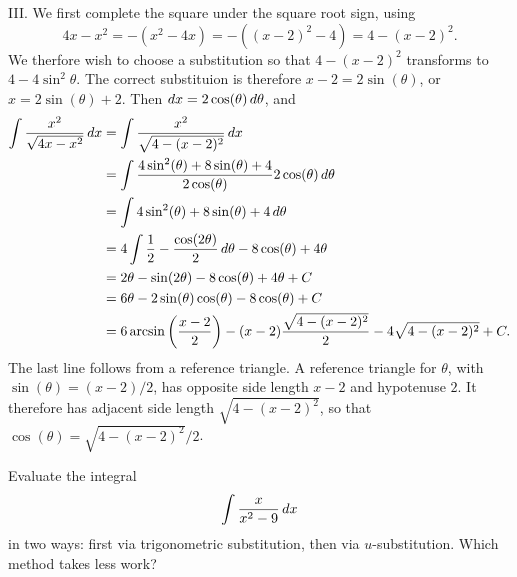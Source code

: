 \documentclass[noauthor]{ximera}
\begin{document}
\begin{freeResponse}
III. We first complete the square under the square root sign, using 
$$
4x-x^2 = -(x^2-4x) = -((x-2)^2-4) = 4-(x-2)^2.
$$
We therfore wish to choose a substitution so that $4-(x-2)^2$ transforms to $4-4\sin^2\theta$. The correct substituion is therefore $x-2 = 2 \sin(\theta)$, or $x= 2 \sin(\theta) + 2$. Then $\mathop{}\!d x = 2 \cos(\theta) \mathop{}\!d \theta$, and 
\begin{align*}
\int \frac{x^2}{\sqrt{4x-x^2}} \mathop{}\!d x & = \int \frac{x^2}{\sqrt{4-(x-2)^2}} \mathop{}\!d x \\
&= \int \frac{4 \sin^2(\theta) + 8 \sin(\theta) + 4}{2 \cos(\theta)} 2 \cos(\theta) \mathop{}\!d \theta \\
&= \int 4 \sin^2(\theta) + 8 \sin(\theta) + 4 \mathop{}\!d \theta \\
&= 4 \int \frac{1}{2} - \frac{\cos (2 \theta)}{2} \mathop{}\!d \theta -8 \cos(\theta) + 4 \theta \\
&= 2 \theta - \sin (2 \theta) - 8 \cos(\theta) + 4 \theta + C \\
&= 6 \theta - 2 \sin(\theta) \cos(\theta) - 8 \cos(\theta) + C \\
&= 6 \arcsin \left(\frac{x-2}{2}\right) - (x-2)\frac{\sqrt{4-(x-2)^2}}{2} - 4 \sqrt{4-(x-2)^2} + C.
\end{align*}
The last line follows from a reference triangle. A reference triangle for $\theta$, with $\sin(\theta) = (x-2)/2$, has opposite side length $x-2$ and hypotenuse $2$. It therefore has adjacent side length $\sqrt{4-(x-2)^2}$, so that $\cos(\theta) = \sqrt{4-(x-2)^2}/2$.
\end{freeResponse}

\begin{problem}
Evaluate the integral
$$
\int \frac{x}{x^2-9} \mathop{}\!d x
$$
in two ways: first via trigonometric substitution, then via $u$-substitution. Which method takes less work?
\end{problem}
\end{document}
